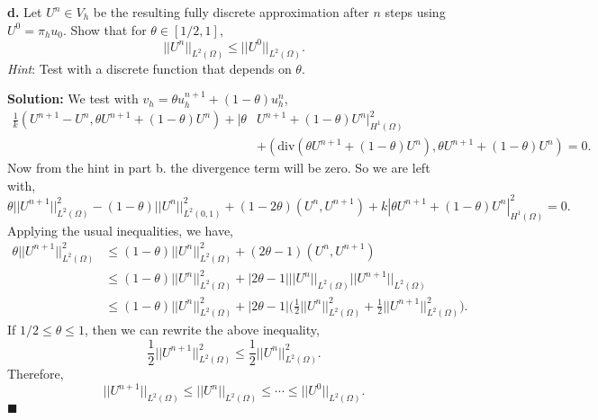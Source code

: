 \documentclass[11pt]{article}
\begin{document}
\vskip 2cm




\textbf{d.} Let $U^n \in V_h$ be the resulting fully discrete approximation after $n$ steps using $U^0 = \pi_h u_0$.
Show that for $\theta \in [1/2,1]$,
\begin{equation}
    ||U^n||_{L^2(\Omega)} \leq ||U^0||_{L^2(\Omega)}.
\end{equation}
\textit{Hint}: Test with a discrete function that depends on $\theta$.


\vskip 1cm

\textbf{Solution:} We test with $v_h = \theta u^{n+1}_h + (1-\theta)u^n_h$, 
\begin{equation*}
\begin{split}
    \frac{1}{k} (U^{n+1} - U^n, \theta U^{n+1} + (1-\theta) U^n ) + |\theta &U^{n+1} + (1-\theta) U^n|^2_{H^1(\Omega)} \\
    &+ (\text{div}(\theta U^{n+1} + (1-\theta) U^n), \theta U^{n+1} + (1-\theta) U^n) = 0.
\end{split}
\end{equation*}
Now from the hint in part b. the divergence term will be zero.
So we are left with,
\begin{equation*}
    \theta ||U^{n+1}||^2_{L^2(\Omega)}  - (1-\theta)||U^n||^2_{L^2(0,1)} + (1 - 2\theta)(U^n, U^{n+1}) + k|\theta U^{n+1} + (1 - \theta)U^n|^2_{H^1(\Omega)} = 0.
\end{equation*}
Applying the usual inequalities, we have,
\begin{align*}
    \theta ||U^{n+1}||^2_{L^2(\Omega)} &\leq (1 - \theta)||U^n||^2_{L^2(\Omega)} + (2\theta - 1) (U^n, U^{n+1}) \\
    &\leq (1 - \theta)||U^n||^2_{L^2(\Omega)} + |2\theta - 1| ||U^n||_{L^2(\Omega)} ||U^{n+1}||_{L^2(\Omega)} \\
    &\leq (1 - \theta)||U^n||^2_{L^2(\Omega)} + |2\theta - 1| \big( \frac{1}{2}||U^n||^2_{L^2(\Omega)}  + \frac{1}{2} ||U^{n+1}||^2_{L^2(\Omega)} \big).
\end{align*}
If $1/2 \leq \theta \leq 1$, then we can rewrite the above inequality,
\begin{equation*}
    \frac{1}{2}||U^{n+1}||^2_{L^2(\Omega)} \leq \frac{1}{2}||U^n||^2_{L^2(\Omega)}.
\end{equation*}
Therefore,
\begin{equation*}
    ||U^{n+1}||_{L^2(\Omega)} \leq ||U^n||_{L^2(\Omega)} \leq \cdots \leq ||U^0||_{L^2(\Omega)}.
\end{equation*}
$\blacksquare$

\vskip 2cm
\end{document}
